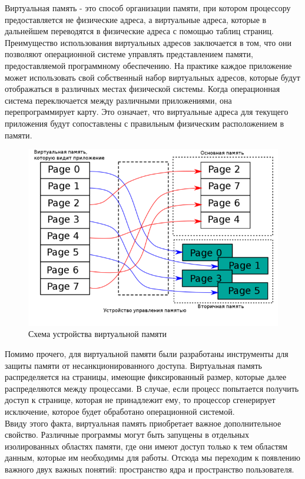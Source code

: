 Виртуальная память - это способ организации памяти, при котором процессору предоставляется не физические адреса, а виртуальные адреса, которые в дальнейшем переводятся в физические адреса с помощью таблиц страниц.
\\
Преимущество использования виртуальных адресов заключается в том,
что они позволяют операционной системе управлять представлением памяти,
предоставляемой программному обеспечению.
На практике каждое приложение может использовать свой собственный набор виртуальных адресов,
которые будут отображаться в различных местах физической системы.
Когда операционная система переключается между различными приложениями, она перепрограммирует карту.
Это означает, что виртуальные адреса для текущего приложения будут сопоставлены с правильным физическим расположением в памяти\cite{arm-virt}.\\

\begin{figure}[H]
    \centering
    \includegraphics[scale=0.5,width=\textwidth]{inc/img/virt_mem}
    \caption{Схема устройства виртуальной памяти}
    \label{fig:virt_mem}
\end{figure}


Помимо прочего, для виртуальной памяти были разработаны инструменты для защиты памяти от несанкционированного доступа.
Виртуальная память распределяется на страницы, имеющие фиксированный размер, которые далее распределяются между процессами.
В случае, если процесс попытается получить доступ к странице, которая не принадлежит ему, то процессор сгенерирует исключение, которое будет обработано операционной системой.
\\
Ввиду этого факта, виртуальная память приобретает важное дополнительное свойство.
Различные программы могут быть запущены в отдельных изолированных областях памяти, где они имеют доступ только к тем областям данным,
которые им необходимы для работы.
Отсюда мы переходим к появлению важного двух важных понятий: пространство ядра и пространство пользователя.
\newpage
